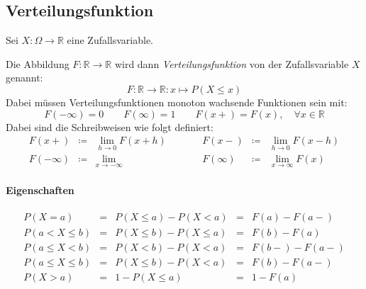 \documentclass[a4paper, 11pt, accentcolor = tud3b]{tudreport}
\newcommand{\R}{\ensuremath{\mathbb{R}}}
\begin{document}
            \subsection{Verteilungsfunktion}
                Sei \( X : \Omega \rightarrow \R \) eine Zufallsvariable.
                
                Die Abbildung \( F : \R \rightarrow \R \) wird dann \textit{Verteilungsfunktion} von der Zufallsvariable \(X\) genannt:
                \begin{equation*}
	                F : \R \rightarrow \R : x \mapsto P(X \leq x)
                \end{equation*}
	            Dabei müssen Verteilungsfunktionen monoton wachsende Funktionen sein mit:
	            \begin{equation*}
		            F(-\infty) = 0 \qquad F(\infty) = 1 \qquad F(x+) = F(x), \quad \forall x \in \R
	            \end{equation*}
	            Dabei sind die Schreibweisen wie folgt definiert:
	            \begin{equation*}
		            \begin{array}{rclcrcl}
		            	     F(x+) & \coloneqq & \lim\limits_{h \rightarrow 0} F(x + h) & \qquad &     F(x-) & \coloneqq & \lim\limits_{h \rightarrow 0} F(x - h)  \\
		            	F(-\infty) & \coloneqq & \lim\limits_{x \rightarrow -\infty}    & \qquad & F(\infty) & \coloneqq & \lim\limits_{x \rightarrow \infty} F(x)
		            \end{array}
	            \end{equation*}
	            
	            \paragraph{Eigenschaften}
		            \begin{equation*}
			            \begin{array}{rclcl}
			            	          P(X = a) & = & P(X \leq a) - P(X < a)    & = & F(a) - F(a-)  \\
			            	   P(a < X \leq b) & = & P(X \leq b) - P(X \leq a) & = & F(b) - F(a)   \\
			            	   P(a \leq X < b) & = & P(X < b) - P(X < a)       & = & F(b-) - F(a-) \\
			            	P(a \leq X \leq b) & = & P(X \leq b) - P(X < a)    & = & F(b) - F(a-)  \\
			            	          P(X > a) & = & 1 - P(X \leq a)           & = & 1 - F(a)
			            \end{array}
		            \end{equation*}
\end{document}
